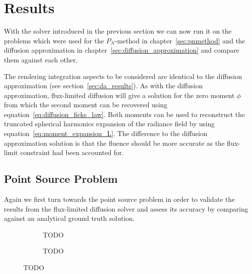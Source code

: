 \section{Results}
\label{sec:fld_results}

With the solver introduced in the previous section we can now run it on the problems which were used for the $P_N$-method in chapter~\ref{sec:pnmethod} and the diffusion approximation in chapter~\ref{sec:diffusion_approximation} and compare them against each other.

The rendering integration aspects to be considered are identical to the diffusion approximation (see section~\ref{sec:da_results}). As with the diffusion approximation, flux-limited diffusion will give a solution for the zero moment $\phi$ from which the second moment can be recovered using equation~\ref{eq:diffusion_ficks_law}. Both moments can be used to reconstruct the truncated spherical harmonics expansion of the radiance field by using equation~\ref{eq:moment_expansion_L}. The difference to the diffusion approximation solution is that the fluence should be more accurate as the flux-limit constraint had been accounted for.

\subsection{Point Source Problem}
\label{sec:pn_results_pointsource}

Again we first turn towards the point source problem in order to validate the results from the flux-limited diffusion solver and assess its accuracy by comparing against an analytical ground truth solution.
\begin{figure}[h]
\centering
\begin{subfigure}{0.49\columnwidth}
\caption{TODO}
\label{fig:fld_results_pointsource_1}
\end{subfigure}%
\hspace{0.01\columnwidth}
\begin{subfigure}{0.49\columnwidth}
\caption{TODO}
\label{fig:fld_results_pointsource_2}
\end{subfigure}%
\caption{TODO}
\label{fig:fld_results_pointsource}
\end{figure}

